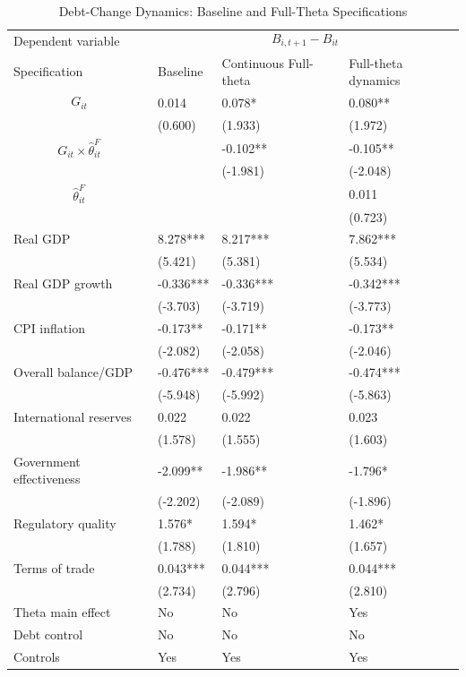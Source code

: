 \begin{table}[H]\centering
\begin{threeparttable}
\caption{Debt-Change Dynamics: Baseline and Full-Theta Specifications}
\label{tab:debt_change_combined_fulltheta}
\scriptsize
\begin{tabularx}{\textwidth}{lYYY}
\toprule
Dependent variable &  \\
\cmidrule(lr){2-4}
Specification & Baseline & Continuous Full-theta & Full-theta dynamics \\
\midrule
$$G_{it}$$ & 0.014 & 0.078* & 0.080** \\
 & (0.600) & (1.933) & (1.972) \\
$$G_{it}\times\widehat{\theta}^{F}_{it}$$ &  & -0.102** & -0.105** \\
 &  & (-1.981) & (-2.048) \\
$$\widehat{\theta}^{F}_{it}$$ &  &  & 0.011 \\
 &  &  & (0.723) \\
Real GDP & 8.278*** & 8.217*** & 7.862*** \\
 & (5.421) & (5.381) & (5.534) \\
Real GDP growth & -0.336*** & -0.336*** & -0.342*** \\
 & (-3.703) & (-3.719) & (-3.773) \\
CPI inflation & -0.173** & -0.171** & -0.173** \\
 & (-2.082) & (-2.058) & (-2.046) \\
Overall balance/GDP & -0.476*** & -0.479*** & -0.474*** \\
 & (-5.948) & (-5.992) & (-5.863) \\
International reserves & 0.022 & 0.022 & 0.023 \\
 & (1.578) & (1.555) & (1.603) \\
Government effectiveness & -2.099** & -1.986** & -1.796* \\
 & (-2.202) & (-2.089) & (-1.896) \\
Regulatory quality & 1.576* & 1.594* & 1.462* \\
 & (1.788) & (1.810) & (1.657) \\
Terms of trade & 0.043*** & 0.044*** & 0.044*** \\
 & (2.734) & (2.796) & (2.810) \\
\midrule
Theta main effect & No & No & Yes \\
Debt control & No & No & No \\
Controls & Yes & Yes & Yes \\

\end{tabularx}
\end{threeparttable}
\end{table}
